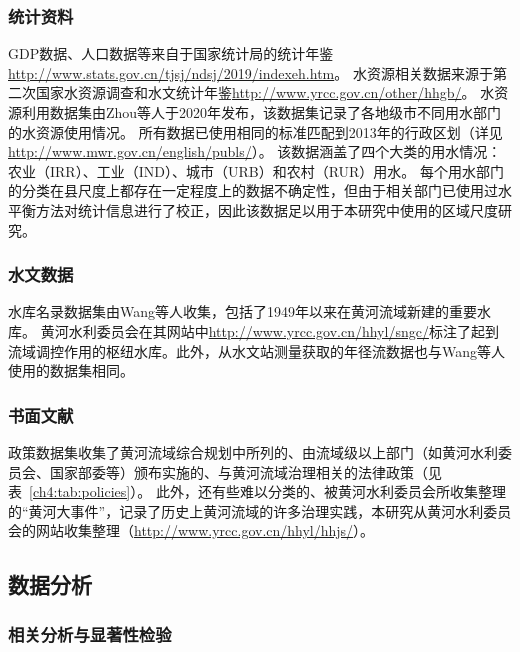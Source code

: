 

\subsubsection{统计资料}
GDP数据、人口数据等来自于国家统计局的统计年鉴\url{http://www.stats.gov.cn/tjsj/ndsj/2019/indexeh.htm}。
水资源相关数据来源于第二次国家水资源调查\cite{zhou2020}和水文统计年鉴\url{http://www.yrcc.gov.cn/other/hhgb/}。
水资源利用数据集由Zhou等人于2020年\cite{zhou2020}发布，该数据集记录了各地级市不同用水部门的水资源使用情况。
所有数据已使用相同的标准匹配到2013年的行政区划（详见\url{http://www.mwr.gov.cn/english/publs/}）。
该数据涵盖了四个大类的用水情况：农业（IRR）、工业（IND）、城市（URB）和农村（RUR）用水\cite{zhou2020}。
每个用水部门的分类在县尺度上都存在一定程度上的数据不确定性，但由于相关部门已使用过水平衡方法对统计信息进行了校正，因此该数据足以用于本研究中使用的区域尺度研究。

\subsubsection{水文数据}
水库名录数据集由Wang等人\cite{wang2019c}收集，包括了1949年以来在黄河流域新建的重要水库。
黄河水利委员会在其网站中\url{http://www.yrcc.gov.cn/hhyl/sngc/}标注了起到流域调控作用的枢纽水库。此外，从水文站测量获取的年径流数据也与Wang等人\cite{wang2019c}使用的数据集相同。

\subsubsection{书面文献}

政策数据集收集了黄河流域综合规划中所列的、由流域级以上部门（如黄河水利委员会、国家部委等）颁布实施的、与黄河流域治理相关的法律政策\cite{shuilibuhuangheshuiliweiyuanhui2010}（见表~\ref{ch4:tab:policies}）。
此外，还有些难以分类的、被黄河水利委员会所收集整理的“黄河大事件”，记录了历史上黄河流域的许多治理实践，本研究从黄河水利委员会的网站收集整理（\url{http://www.yrcc.gov.cn/hhyl/hhjs/}）。


\subsection{数据分析}

\subsubsection{相关分析与显著性检验}

